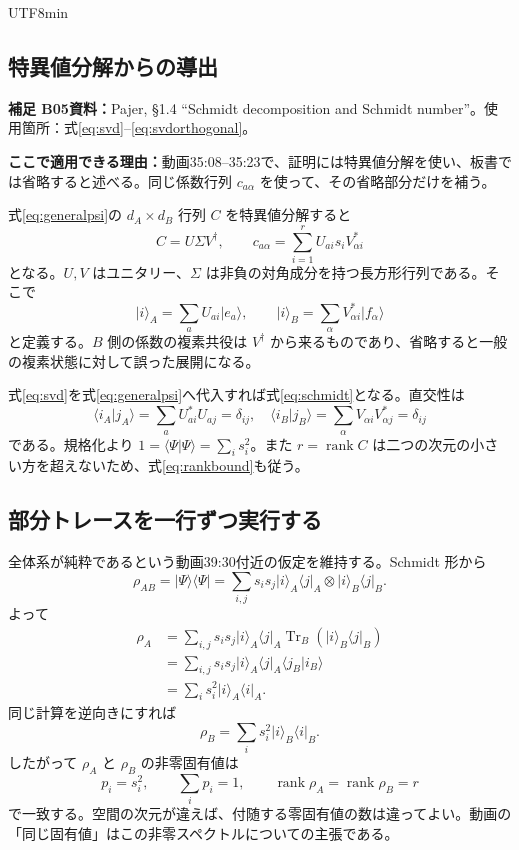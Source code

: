 \documentclass[11pt,a4paper]{article}
\numberwithin{equation}{section}
\newcommand{\Tr}{\operatorname{Tr}}
\newcommand{\rank}{\operatorname{rank}}
\newcommand{\ket}[1]{\lvert#1\rangle}
\newcommand{\bra}[1]{\langle#1\rvert}
\newcommand{\braket}[2]{\langle#1\vert#2\rangle}
\newcommand{\supp}[3]{\par\smallskip\noindent\textcolor{BrickRed}{\textbf{補足 #1}}\quad\textbf{資料：}#2\par\noindent\textbf{ここで適用できる理由：}#3\par}
\begin{document}
\begin{CJK*}{UTF8}{min}
\subsection{特異値分解からの導出}
\supp{B05}{Pajer\cite{pajer}, §1.4 ``Schmidt decomposition and Schmidt number''。使用箇所：式\eqref{eq:svd}--\eqref{eq:svdorthogonal}。}{動画35:08--35:23で、証明には特異値分解を使い、板書では省略すると述べる。同じ係数行列 $c_{a\alpha}$ を使って、その省略部分だけを補う。}
式\eqref{eq:generalpsi}の $d_A\times d_B$ 行列 $C$ を特異値分解すると
\begin{equation}
C=U\Sigma V^\dagger,
\qquad c_{a\alpha}=\sum_{i=1}^{r}U_{ai}s_iV^*_{\alpha i}
\label{eq:svd}
\end{equation}
となる。$U,V$ はユニタリー、$\Sigma$ は非負の対角成分を持つ長方形行列である。そこで
\begin{equation}
\ket{i}_A=\sum_aU_{ai}\ket{e_a},
\qquad \ket{i}_B=\sum_\alpha V^*_{\alpha i}\ket{f_\alpha}
\label{eq:svdbases}
\end{equation}
と定義する。$B$ 側の係数の複素共役は $V^\dagger$ から来るものであり、省略すると一般の複素状態に対して誤った展開になる。

式\eqref{eq:svd}を式\eqref{eq:generalpsi}へ代入すれば式\eqref{eq:schmidt}となる。直交性は
\begin{equation}
\braket{i_A}{j_A}=\sum_aU^*_{ai}U_{aj}=\delta_{ij},
\quad
\braket{i_B}{j_B}=\sum_\alpha V_{\alpha i}V^*_{\alpha j}=\delta_{ij}
\label{eq:svdorthogonal}
\end{equation}
である。規格化より $1=\braket{\Psi}{\Psi}=\sum_i s_i^2$。また $r=\rank C$ は二つの次元の小さい方を超えないため、式\eqref{eq:rankbound}も従う。

\subsection{部分トレースを一行ずつ実行する}
全体系が純粋であるという動画39:30付近の仮定を維持する。Schmidt 形から
\begin{equation}
\rho_{AB}=\ket{\Psi}\bra{\Psi}
=\sum_{i,j}s_is_j\ket{i}_A\bra{j}_A\otimes\ket{i}_B\bra{j}_B.
\end{equation}
よって
\begin{align}
\rho_A
&=\sum_{i,j}s_is_j\ket{i}_A\bra{j}_A
\Tr_B(\ket{i}_B\bra{j}_B)\nonumber\\
&=\sum_{i,j}s_is_j\ket{i}_A\bra{j}_A\braket{j_B}{i_B}\nonumber\\
&=\sum_is_i^2\ket{i}_A\bra{i}_A.
\label{eq:schmidt-reduced}
\end{align}
同じ計算を逆向きにすれば
\begin{equation}
\rho_B=\sum_is_i^2\ket{i}_B\bra{i}_B.
\end{equation}
したがって $\rho_A$ と $\rho_B$ の非零固有値は
\begin{equation}
p_i=s_i^2,\qquad\sum_ip_i=1,
\qquad\rank\rho_A=\rank\rho_B=r
\label{eq:common-spectrum}
\end{equation}
で一致する。空間の次元が違えば、付随する零固有値の数は違ってよい。動画の「同じ固有値」はこの非零スペクトルについての主張である。


\end{CJK*}
\end{document}
